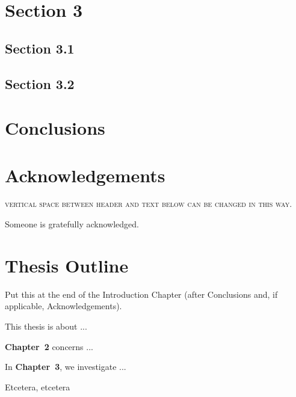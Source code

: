 \documentclass[main_brownies.tex]{subfiles}
\begin{document}
\noindent\dotfill

\Blindtext[1][1]
\medskip
\noindent{\blindtext[1]}

\noindent\dotfill

\section{Section 3}
\subsection{Section 3.1}
\subsection{Section 3.2}




\section{Conclusions}
\Blindtext[1][2]

\section*{Acknowledgements}
\vspace*{-.8\baselineskip} %
\textsc{vertical space between header and text below can be changed in this way.}

Someone is gratefully acknowledged.

\section*{Thesis Outline}

Put this at the end of the Introduction Chapter (after Conclusions and, if applicable, Acknowledgements).

This thesis is about ...

\textbf{Chapter~2} concerns ...

In \textbf{Chapter~3}, we investigate ...

Etcetera, etcetera


\FloatBarrier %

{\raggedright
\printbibliography} %


\end{document}
